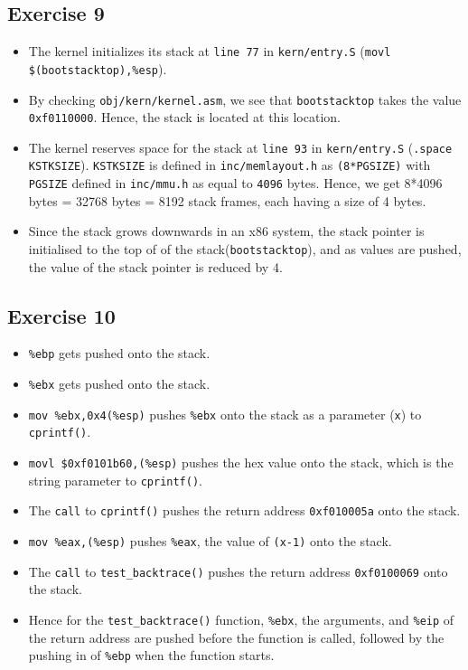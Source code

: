 \documentclass[]{article}
\begin{document}
\subsection{Exercise 9}

\begin{itemize}
\itemsep1pt\parskip0pt
\item
  The kernel initializes its stack at \texttt{line 77} in
  \texttt{kern/entry.S} (\texttt{movl \$(bootstacktop),\%esp}).
\item
  By checking \texttt{obj/kern/kernel.asm}, we see that
  \texttt{bootstacktop} takes the value \texttt{0xf0110000}. Hence, the
  stack is located at this location.
\item
  The kernel reserves space for the stack at \texttt{line 93} in
  \texttt{kern/entry.S} (\texttt{.space KSTKSIZE}). \texttt{KSTKSIZE} is
  defined in \texttt{inc/memlayout.h} as \texttt{(8*PGSIZE)} with
  \texttt{PGSIZE} defined in \texttt{inc/mmu.h} as equal to
  \texttt{4096} bytes. Hence, we get 8*4096 bytes = 32768 bytes = 8192
  stack frames, each having a size of 4 bytes.
\item
  Since the stack grows downwards in an x86 system, the stack pointer is
  initialised to the top of of the stack(\texttt{bootstacktop}), and as
  values are pushed, the value of the stack pointer is reduced by 4.
\end{itemize}

\subsection{Exercise 10}

\begin{itemize}
\itemsep1pt\parskip0pt
\item
  \texttt{\%ebp} gets pushed onto the stack.
\item
  \texttt{\%ebx} gets pushed onto the stack.
\item
  \texttt{mov \%ebx,0x4(\%esp)} pushes \texttt{\%ebx} onto the stack as
  a parameter (\texttt{x}) to \texttt{cprintf()}.
\item
  \texttt{movl \$0xf0101b60,(\%esp)} pushes the hex value onto the
  stack, which is the string parameter to \texttt{cprintf()}.
\item
  The \texttt{call} to \texttt{cprintf()} pushes the return address
  \texttt{0xf010005a} onto the stack.
\item
  \texttt{mov \%eax,(\%esp)} pushes \texttt{\%eax}, the value of
  \texttt{(x-1)} onto the stack.
\item
  The \texttt{call} to \texttt{test\_backtrace()} pushes the return
  address \texttt{0xf0100069} onto the stack.
\item
  Hence for the \texttt{test\_backtrace()} function, \texttt{\%ebx}, the
  arguments, and \texttt{\%eip} of the return address are pushed before
  the function is called, followed by the pushing in of \texttt{\%ebp}
  when the function starts.
\end{itemize}
\end{document}
